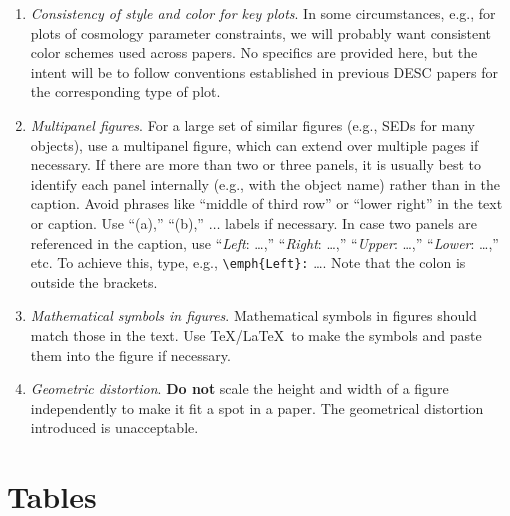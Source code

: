 \documentclass[letterpaper,11pt]{article}
\begin{document}
\begin{enumerate}
\item{{\it Consistency of style and color for key plots\/}.  In some circumstances, e.g., for plots of cosmology parameter constraints, we will probably want consistent color schemes used across papers.  No specifics are provided here, but the intent will be to follow conventions established in previous DESC papers for the corresponding type of plot. }

\item {\it Multipanel figures\/}.  For a large set of similar figures (e.g.,
SEDs for many objects), use a multipanel figure, which can extend over multiple
pages if necessary.  If there are more than two or three panels, it is usually
best to identify each panel internally (e.g., with the object name) rather
than in the caption.  Avoid phrases like ``middle of third row'' or ``lower
right'' in the text or caption.  Use ``(a),''  ``(b),'' $\dots$ labels if
necessary.  In case two panels are referenced in the caption, use
``{\it Left\/}: \dots,'' ``{\it Right\/}: \dots ,'' ``{\it Upper\/}: \dots,''
``{\it Lower\/}: \dots,''
etc.  To achieve this, type, e.g., \verb|\emph{Left}:| \dots.
Note that the colon is outside the brackets.

\item {\it Mathematical symbols in figures\/}.  Mathematical symbols in
figures should match those in the text. Use \TeX/La\TeX\ to make the symbols
and paste them into the figure if necessary.

\item {\it Geometric distortion\/}.  {\bf Do not} scale the height and width of a figure independently to make it fit a spot in a paper.  The geometrical distortion introduced is unacceptable.  
\end{enumerate}

\section{Tables} \label{sec:tables}

\end{document}
